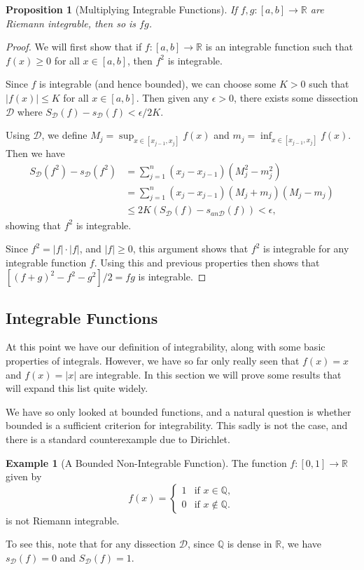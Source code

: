 \documentclass[11pt, a4paper]{article}
\newtheorem{proposition}[theorem]{Proposition}
\theoremstyle{definition}
\newtheorem{example}[theorem]{Example}
\newcommand{\Q}{\mathbb{Q}}
\newcommand{\R}{\mathbb{R}}
\newcommand{\DD}{\mathcal{D}}
\begin{document}
\begin{proposition}[Multiplying Integrable Functions]
	If $f, g : [a, b] \rightarrow \R$ are Riemann integrable, then so is $fg$.
\end{proposition}
\begin{proof}
	We will first show that if $f: [a, b ]\rightarrow \R$ is an integrable function such that $f(x) \geq 0$ for all $x \in [a, b]$, then $f^2$ is integrable. 
	
	Since $f$ is integrable (and hence bounded), we can choose some  $K > 0$ such that $|f(x)| \leq K$ for all $x \in [a, b]$. Then given any $\epsilon> 0$, there exists some dissection $\DD$ where $S_{\DD}(f) - s_{\DD}(f) < \epsilon/2K$.

	Using $\DD$, we define $M_j = \sup_{x \in [x_{j - 1}, x_j]} f(x)$ and $m_j = \inf_{x \in [x_{j - 1}, x_j]} f(x)$. Then we have
	\begin{align*}
		S_\DD(f^2) - s_{\DD}(f^2) &= \sum_{j = 1}^{n} (x_{j} - x_{j - 1}) (M_j^2 - m_j^2) \\
		&= \sum_{j = 1}^{n} (x_{j} - x_{j - 1}) (M_j + m_j) (M_j - m_j)  \\
		&\leq  2K (S_\DD(f) - s_{an\DD}(f)) < \epsilon,
	\end{align*}
	showing that $f^2$ is integrable.

	Since $f^2 = |f| \cdot |f|$, and $|f| \geq 0$, this argument shows that $f^2$ is integrable for any integrable function $f$.
	Using this and previous properties then shows that $[(f + g)^2 - f^2 - g^2]/2 = fg$ is integrable.
\end{proof}

\subsection{Integrable Functions}

At this point we have our definition of integrability, along with some basic properties of integrals. However, we have so far only really seen that $f(x) = x$ and $f(x) = |x|$ are integrable. In this section we will prove some results that will expand this list quite widely.

We have so only looked at bounded functions, and a natural question is whether bounded is a sufficient criterion for integrability.
This sadly is not the case, and there is a standard counterexample due to Dirichlet.

\begin{example}[A Bounded Non-Integrable Function]
The function $f:[0, 1] \rightarrow \R$ given by
$$
f(x) = \begin{cases}
	1 &\mbox{if } x \in \Q, \\
	0 &\mbox{if } x \not\in \Q.
	\end{cases}
$$
is not Riemann integrable.

To see this, note that for any dissection $\DD$, since $\Q$ is dense in $\R$, we have $s_{\DD}(f) = 0$ and $S_{\DD}(f) = 1$.
 \end{example}
\end{document}
